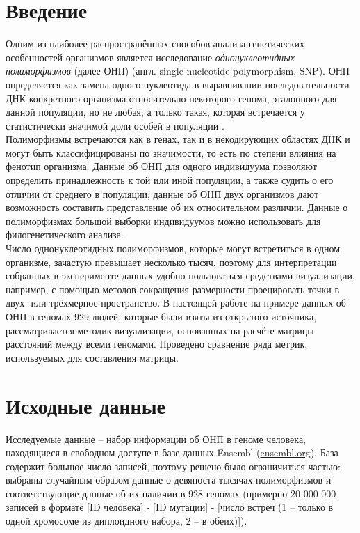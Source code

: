 \documentclass[main.tex]{subfiles}
\begin{document}
\section{Введение} \label{intro}

Одним из наиболее распространённых способов анализа генетических особенностей организмов является исследование \textit{однонуклеотидных полиморфизмов} (далее ОНП) (англ. single-nucleotide polymorphism, SNP). ОНП определяется как замена одного нуклеотида в выравнивании последовательности ДНК конкретного организма относительно некоторого генома, эталонного для данной популяции, но не любая, а только такая, которая встречается у статистически значимой доли особей в популяции \cite{butler}.\\
Полиморфизмы встречаются как в генах, так и в некодирующих областях ДНК и могут быть классифицированы по значимости, то есть по степени влияния на фенотип организма. Данные об ОНП для одного индивидуума позволяют определить принадлежность к той или иной популяции, а также судить о его отличии от среднего в популяции; данные об ОНП двух организмов дают возможность составить представление об их относительном различии. Данные о полиморфизмах большой выборки индивидуумов можно использовать для филогенетического анализа. \\
Число однонуклеотидных полиморфизмов, которые могут встретиться в одном организме, зачастую превышает несколько тысяч, поэтому для интерпретации собранных в эксперименте данных удобно пользоваться средствами визуализации, например, с помощью методов сокращения размерности проецировать точки в двух- или трёхмерное пространство. В настоящей работе на примере данных об ОНП в геномах 929 людей, которые были взяты из открытого источника, рассматривается методик визуализации, основанных на расчёте матрицы расстояний между всеми геномами. Проведено сравнение ряда метрик, используемых для составления матрицы.

\newpage
\section{Исходные данные} \label{input}

Исследуемые данные -- набор информации об ОНП в геноме человека, находящиеся в свободном доступе в базе данных Ensembl (\href{https://www.ensembl.org}{ensembl.org}). База содержит большое число записей, поэтому решено было ограничиться частью: выбраны случайным образом данные о девяноста тысячах полиморфизмов и соответствующие данные об их наличии в 928 геномах (примерно 20 000 000 записей в формате [ID человека] - [ID мутации] - [число встреч (1 -- только в одной хромосоме из диплоидного набора, 2 -- в обеих)]).
\end{document}
